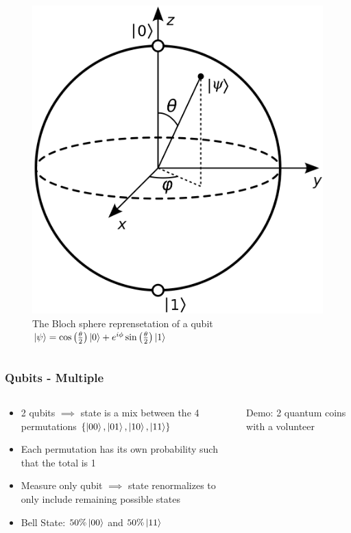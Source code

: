 \documentclass[aspectratio=169]{beamer}
\begin{document}
\begin{frame}
\begin{columns}
\begin{column}{0.5\textwidth}
\begin{figure}[h]
                \centering
                \includegraphics[height=0.7\textheight]{images/Bloch_sphere.png}
                \caption{The Bloch sphere reprensetation of a qubit \\ $\ket{\psi} = \cos \left( \frac{\theta}{2} \right) \ket{0} + e^{i \phi} \sin \left( \frac{\theta}{2} \right) \ket{1}$}
            \end{figure}
        \end{column}
    \end{columns}
\end{frame}

\begin{frame}
    \frametitle{Qubits - Multiple}
    \begin{columns}
        \begin{column}{0.5\textwidth}
            \begin{itemize}
                \item 2 qubits $\implies$ state is a mix between the 4 permutations $\{\ket{00}, \ket{01}, \ket{10}, \ket{11} \}$
                \item Each permutation has its own probability such that the total is 1
                \item Measure only qubit $\implies$ state renormalizes to only include remaining possible states
                \item Bell State: $50\% \ket{00}$ and $50\% \ket{11}$
            \end{itemize}
        \end{column}
        \begin{column}{0.5\textwidth}
            \centering Demo: 2 quantum coins with a volunteer
        \end{column}
    \end{columns}
\end{frame}
\end{document}
